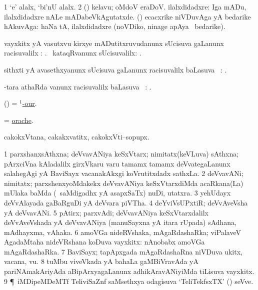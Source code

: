 \noindent
\gl{\pagu}
\bmng
\bnum
\num{1}  `e' alalx, `bi'nU alalx. 
\num{2}  (\AmA) kelavu; oMdoV eraDoV. 
  
\banum
{} ilalxdidadxre:  Iga mADu, ilalxdidadxre nALe mADabeVkAgutatxde. 
 (\AmA) ecacxrike niVDuvAga yA bedarike hAkuvAga:  haNa tA, ilalxdidadxre (noVDiko, ninage apAya \mo\ bedarike). 
\eanum
\numie
\enum
\emng
\eentry

\bentry
{}
\gl{\uparx}
\bmng
\banum
{} vayxkitx yA vasutxvu kirxye mADutitxruvudanunx sUcisuva \nA gaLanunx racisuvalilx \parx: . 
 \sA\ kataqRvanunx sUcisuvalilx: . 
\eanum
\emng
\eentry

\bentry
{}
\gl{\uparx}
\bmng
sithxti yA avasethxyanunx sUcisuva \nA gaLanunx racisuvalilx baLasuva \uparx\ : . 
\emng
\eentry

\bentry
{}
\gl{\uparx}
\bmng
-tara athaRda \gu vanunx racisuvalilx baLasuva \uparx\ : . 
\emng
\eentry

\bentry
{}
\gl{\uparx}
\bmng
(\ame) = \hyperlink{hyp-our(1)}{$^1$-our}. 
\emng
\eentry

\bentry
{}
\gl{\nA}
\bmng
= \hyperlink{orache}{orache}. 
\emng
\eentry

\bentry
{}
\gl{\nA}
\bmng
cakokxVtana, cakakxvatitx, cakokxVti--sopupx. 
\emng
\eentry

\bentry
{}
\gl{\nA}
\bmng
\bnum
\num{1} parxshanxsAthxna; deVvavANiya keSxVtarx; nimitatx(keVLuva) sAthxna; pArxciVna kAladalilx girxVkaru \mo varu tamamx tamamx deVvategaLanunx salahegAgi yA BaviSayx vacanakAkxgi koVrutitxdadx sathxLa. 
\num{2} deVvavANi; nimitatx; parxshenxyoMdakekx deVvavANiya keSxVtarxdiMda acaRkana(La) mUlaka baMda (\sA\ saMdigadhx yA asapxSaTx) nuDi, utatxra. 
\num{3} yehUdayx deVvAlayada gaBaRguDi yA deVvara piVTha. 
\num{4} deYviVsUPxtiR; deVvAveVsha yA deVvavANi. 
\num{5} pAtirx; parxvAdi; deVvavANiya keSxVtarxdalilx deVvAveVshada yA deVvavANiya (manuSayxna yA itara rUpada) sAdhana, mAdhayxma, vAhaka. 
\num{6} amoVGa nideRVshaka, mAgaRdashaRka; viPalaveV AgadaMtaha nideVRshana koDuva vayxkitx:  nAnobabx amoVGa mAgaRdashaRka. 
\num{7} BaviSayx; tapApxgada mAgaRdashaRna niVDuva ukitx, vacana, \mo vu. 
\num{8} tuMbu viveVkada yA bahaLa gaMBiVravAda yA pariNAmakAriyAda aBipArxyagaLanunx adhikAravANiyiMda tiLisuva vayxkitx. 
\num{9}  \P\ iMDipeMDeMTf TeliviSaZnf saMsethxya odagisuva `TeliTekfsxTX' () seVve. 
\enum
\emng
\eentry

